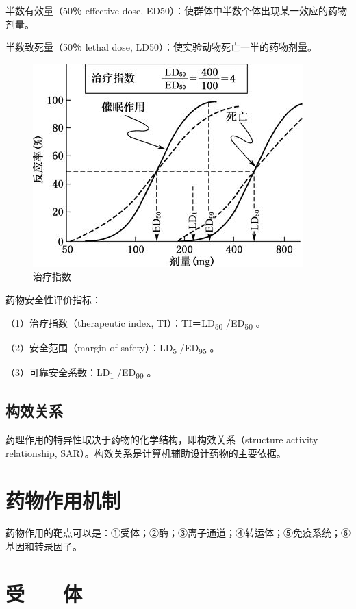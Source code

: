 半数有效量（50％ effective dose,
ED50）：使群体中半数个体出现某一效应的药物剂量。

半数致死量（50％ lethal dose, LD50）：使实验动物死亡一半的药物剂量。

\begin{figure}[!htbp]
 \centering
 \includegraphics{./images/Image00007.jpg}
 \captionsetup{justification=centering}
 \caption{治疗指数}
 \label{fig2-4}
  \end{figure} 

药物安全性评价指标：

（1）治疗指数（therapeutic index, TI）：TI＝LD\textsubscript{50}
/ED\textsubscript{50} 。

（2）安全范围（margin of safety）：LD\textsubscript{5}
/ED\textsubscript{95} 。

（3）可靠安全系数：LD\textsubscript{1} /ED\textsubscript{99} 。

\subsection{构效关系}

药理作用的特异性取决于药物的化学结构，即构效关系（structure activity
relationship, SAR）。构效关系是计算机辅助设计药物的主要依据。

\section{药物作用机制}

药物作用的靶点可以是：①受体；②酶；③离子通道；④转运体；⑤免疫系统；⑥基因和转录因子。

\section{受　　体}


